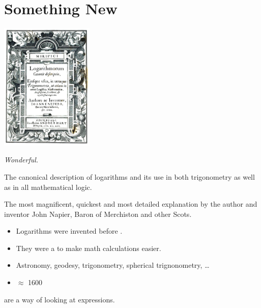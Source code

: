 \section*{Something New}

\begin{minipage}{0.25\textwidth}
    \includegraphics[width=1.75in]{Logarithms_book_Napier}
\end{minipage}
\hfil 
\begin{minipage}{0.7\textwidth}
    {\itshape
    Wonderful.

    The canonical description of logarithms 
    and its use in both trigonometry as well as in all mathematical logic.

    The most magnificent, quickest and most detailed explanation by the
    author and inventor 
    John Napier, Baron of Merchiston and other Scots.
    }
    \begin{itemize}[fullwidth]
        \item Logarithms were invented before .
        \item They were a  to make math calculations easier.
        \item Astronomy, geodesy, trigonometry, spherical trignonometry, \dots
        \item $\approx$ 1600
    \end{itemize}
\end{minipage}
\hfil 

\begin{tcolorbox}[center,colback=white,width=5.5in]
     are a way of looking  
    at  expressions.
\end{tcolorbox}